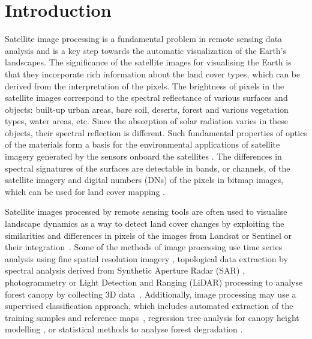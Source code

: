 \documentclass[applsci,article,accept,pdftex,moreauthors]{Definitions/mdpi}
\begin{document}
\section{Introduction}
Satellite image processing is a fundamental problem in remote sensing data analysis and is a key step towards the automatic visualization of the Earth's landscapes. The significance of the satellite images for visualising the Earth is that they incorporate rich information about the land cover types, which can be derived from the interpretation of the pixels. The brightness of pixels in the satellite images correspond to the spectral reflectance of various surfaces and objects: built-up urban areas, bare soil, deserts, forest and various vegetation types, water areas, etc. Since the absorption of solar radiation varies in these objects, their spectral reflection is different. Such fundamental properties of optics of the materials form a basis for the environmental applications of satellite imagery generated by the sensors onboard the satellites \cite{Lillesand}. The differences in spectral signatures of the surfaces are detectable in bands, or channels, of the satellite imagery and digital numbers (DNs) of the pixels in bitmap images, which can be used for land cover mapping \cite{Manakos}. 

Satellite images processed by remote sensing tools are often used to visualise landscape dynamics as a way to detect land cover changes by exploiting the similarities and differences in pixels of the images from Landsat \cite{SIKUZANI2020e01333,DUVEILLER20081969} or Sentinel \cite{9554698,Lemenkova202021,9553905} or their integration~\cite{ZHANG2021112470,CHEN2021102386}. Some of the methods of image processing use time series analysis using fine spatial resolution imagery \cite{7326202,6352722}, topological data extraction by spectral analysis derived from Synthetic Aperture Radar (SAR) \cite{1027205,520569}, photogrammetry {or} Light Detection and Ranging (LiDAR) processing to analyse forest canopy {by collecting 3D data}~\cite{rs13183777}. Additionally, image processing may use a supervised classification approach, which includes automated extraction of the training samples and reference maps~\cite{rs12172705}, regression tree analysis for canopy height modelling \cite{HANSEN2016221}, or statistical methods to analyse forest degradation \cite{7326141}.
\end{document}
